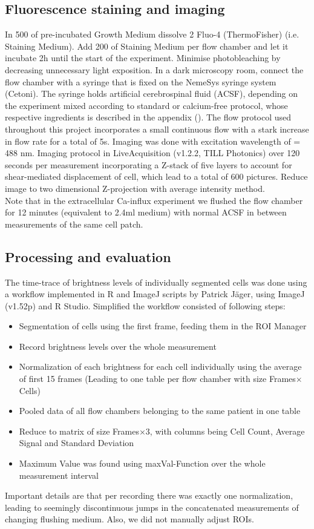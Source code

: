 \subsection{Fluorescence staining and imaging}
In 500\mul{} of pre-incubated Growth Medium dissolve 2\mul{} Fluo-4 (ThermoFisher) (i.e. Staining Medium). Add 200\mul{} of Staining Medium per flow chamber and let it incubate 2h until the start of the experiment. 
Minimise photobleaching by decreasing unnecessary light exposition. In a dark microscopy room, connect the flow chamber with a syringe that is fixed on the NemeSys syringe system (Cetoni). The syringe holds artificial cerebrospinal fluid (ACSF), depending on the experiment mixed according to standard or calcium-free protocol, whose respective ingredients is described in the appendix (). The flow protocol used throughout this project incorporates a small continuous flow with a stark increase in flow rate for a total of 5s. Imaging was done with excitation wavelength of \textlambda{} = 488 nm. Imaging protocol in LiveAcquisition (v1.2.2, TILL Photonics) over 120 seconds per measurement incorporating a Z-stack of five layers to account for shear-mediated displacement of cell, which lead to a total of 600 pictures. Reduce image to two dimensional Z-projection with average intensity method.  \\
Note that in the extracellular Ca-influx experiment we flushed the flow chamber for 12 minutes (equivalent to 2.4ml medium) with normal ACSF in between measurements of the same cell patch.


\subsection{Processing and evaluation}

The time-trace of brightness levels of individually segmented cells was done using a workflow implemented in R and ImageJ scripts by Patrick Jäger, using ImageJ (v1.52p) and R Studio. Simplified the workflow consisted of following steps:

\begin{itemize}
	\item Segmentation of cells using the first frame, feeding them in the ROI Manager
	\item Record brightness levels over the whole measurement
	\item Normalization of each brightness for each cell individually using the average of first 15 frames (Leading to one table per flow chamber with size Frames$\times$Cells)
	\item Pooled data of all flow chambers belonging to the same patient in one table
	\item Reduce to matrix of size Frames$\times$3, with columns being Cell Count, Average Signal and Standard Deviation
	\item Maximum Value was found using maxVal-Function over the whole measurement interval
\end{itemize}

Important details are that per recording there was exactly one normalization, leading to seemingly discontinuous jumps in the concatenated measurements of changing flushing medium. Also, we did not manually adjust ROIs. 



